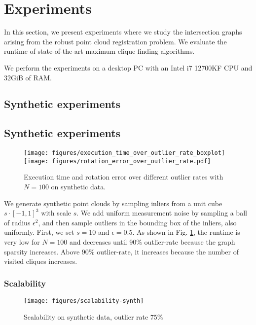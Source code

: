 
\section{Experiments}
In this section, we present experiments where we study the intersection graphs arising from the robust point cloud registration problem. We evaluate the runtime of state-of-the-art maximum clique finding algorithms.

\label{sec:evaluation}
We perform the experiments on a desktop PC with an Intel i7 12700KF CPU and 32GiB of RAM.
\subsection{Synthetic experiments}


\subsection{Synthetic experiments}
\begin{figure}[!ht]
	\centering
	\texttt{[image: figures/execution\_time\_over\_outlier\_rate\_boxplot]}
	\texttt{[image: figures/rotation\_error\_over\_outlier\_rate.pdf]}
	\caption{Execution time and rotation error over different outlier rates with $N=100$ on synthetic data.}
	\label{fig:execution-time-over-outlier-rate}
\end{figure}

We generate synthetic point clouds by sampling inliers from a unit cube $s \cdot [-1, 1]^3$ with scale $s$. We add uniform measurement noise by sampling a ball of radius $\epsilon^2$, and then sample outliers in the bounding box of the inliers, also uniformly. First, we set $s=10$ and $\epsilon=0.5$. As shown in Fig. \ref{fig:execution-time-over-outlier-rate}, the runtime is very low for $N =100$ and decreases until 90\% outlier-rate because the graph sparsity increases. Above 90\% outlier-rate, it increases because the number of visited cliques increases.

\subsubsection{Scalability}
\begin{figure}[!ht]
	\centering
	\texttt{[image: figures/scalability-synth]}
	\caption{Scalability on synthetic data, outlier rate $75\%$}
	\label{fig:execution-time-over-n}
\end{figure}

